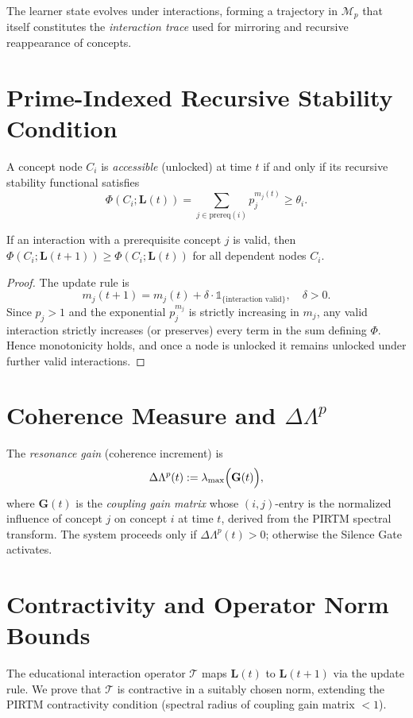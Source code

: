 \documentclass[11pt,letterpaper]{article}
\begin{document}
The learner state evolves under interactions, forming a trajectory in $\mathcal{M}_p$ that itself constitutes the \emph{interaction trace} used for mirroring and recursive reappearance of concepts.

\section{Prime-Indexed Recursive Stability Condition}
\begin{definition}
A concept node $C_i$ is \emph{accessible} (unlocked) at time $t$ if and only if its recursive stability functional satisfies
\[
\Phi(C_i;\mathbf{L}(t)) = \sum_{j \in \text{prereq}(i)} p_j^{m_j(t)} \geq \theta_i.
\]
\end{definition}

\begin{theorem}
If an interaction with a prerequisite concept $j$ is valid, then $\Phi(C_i;\mathbf{L}(t+1)) \geq \Phi(C_i;\mathbf{L}(t))$ for all dependent nodes $C_i$.
\end{theorem}
\begin{proof}
The update rule is
\[
m_j(t+1) = m_j(t) + \delta \cdot \mathbb{1}_{\{\text{interaction valid}\}}, \quad \delta > 0.
\]
Since $p_j > 1$ and the exponential $p_j^{m_j}$ is strictly increasing in $m_j$, any valid interaction strictly increases (or preserves) every term in the sum defining $\Phi$. Hence monotonicity holds, and once a node is unlocked it remains unlocked under further valid interactions.
\end{proof}

\section{Coherence Measure and $\Delta\Lambda^p$}
\begin{definition}
The \emph{resonance gain} (coherence increment) is
\[
\Delta\Lambda^p(t) := \lambda_{\max}\Bigl(\mathbf{G}(t)\Bigr),
\]
where $\mathbf{G}(t)$ is the \emph{coupling gain matrix} whose $(i,j)$-entry is the normalized influence of concept $j$ on concept $i$ at time $t$, derived from the PIRTM spectral transform. The system proceeds only if $\Delta\Lambda^p(t) > 0$; otherwise the Silence Gate activates.
\end{definition}

\section{Contractivity and Operator Norm Bounds}
The educational interaction operator $\mathcal{T}$ maps $\mathbf{L}(t)$ to $\mathbf{L}(t+1)$ via the update rule. We prove that $\mathcal{T}$ is contractive in a suitably chosen norm, extending the PIRTM contractivity condition (spectral radius of coupling gain matrix $<1$).
\end{document}
